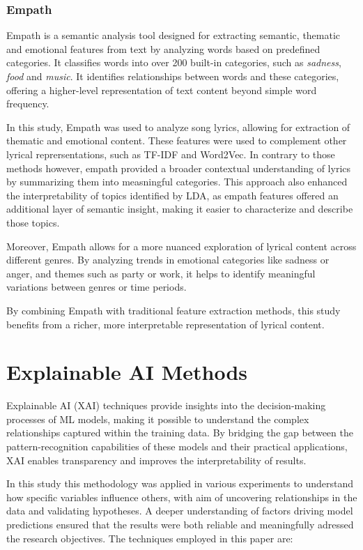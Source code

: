 \subsubsection*{Empath}
Empath\cite{empath} is a semantic analysis tool designed for extracting
semantic, thematic and emotional features from text by analyzing words based on
predefined categories. It classifies words into over 200 built-in categories,
such as \textit{sadness}, \textit{food} and \textit{music}. It  identifies
relationships between words and these categories, offering a higher-level
representation of text content beyond simple word frequency.

In this study, Empath was  used to analyze song lyrics, allowing for extraction
of thematic and  emotional content. These features were used to complement
other lyrical reprersentations, such as TF-IDF and Word2Vec. In contrary to
those methods however, empath provided a broader contextual understanding of
lyrics by summarizing them into measningful categories. This approach also
enhanced the interpretability of topics identified by LDA, as empath features
offered an additional layer of semantic insight, making it easier to
characterize and describe those topics.

Moreover, Empath allows for a more nuanced exploration of lyrical content
across different genres. By analyzing trends in emotional categories like
sadness or anger, and themes such as party or work, it helps to identify
meaningful variations between genres or time periods.

By combining Empath with traditional feature extraction methods, this study
benefits from a richer, more interpretable representation of lyrical content.



\section{Explainable AI Methods}
\label{sec:explainableaimethods}


Explainable AI (XAI) techniques provide insights into the decision-making
processes of ML models, making it possible to understand the complex
relationships captured within the training data. By bridging the gap between
the pattern-recognition capabilities of these models and their practical
applications, XAI enables transparency and improves the interpretability of
results.

In this study this methodology was applied in various experiments to understand
how specific variables influence others, with aim of uncovering relationships
in the data and validating hypotheses. A deeper  understanding of factors
driving model predictions ensured that the results were both reliable and
meaningfully adressed the research objectives. The  techniques employed in this paper are: 

